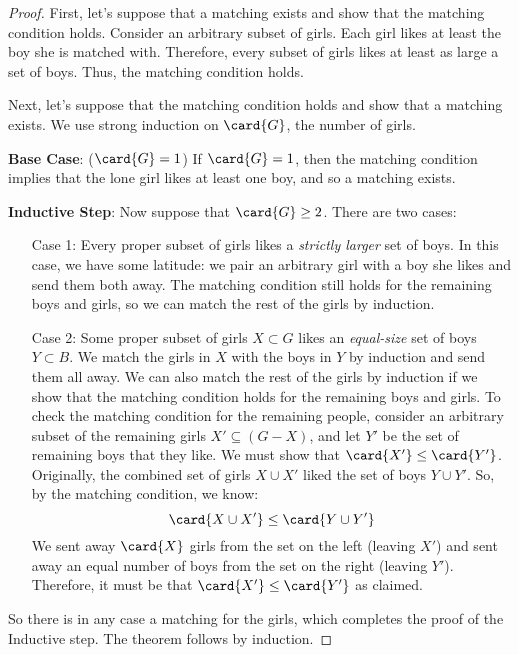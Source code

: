 \begin{proof}
First, let's suppose that a matching exists and show that the matching condition
holds.  Consider an arbitrary subset of girls.  Each girl likes at least the boy she
is matched with.  Therefore, every subset of girls likes at least as large a set of
boys.  Thus, the matching condition holds.

Next, let's suppose that the matching condition holds and show that a matching
exists.  We use strong induction on $\card{G}$, the number of girls.

\textbf{Base Case}: ($\card{G}=1$) If $\card{G} = 1$, then the 
matching condition implies that the lone girl likes at least one boy, and so a
matching exists.

\textbf{Inductive Step}: Now suppose that $\card{G} \geq 2$.  There are two cases:

\begin{itemize}

\item[Case 1:] Every proper subset of girls likes a \emph{strictly larger} set of
  boys.  In this case, we have some latitude: we pair an arbitrary girl with a boy
  she likes and send them both away.  The matching condition still holds for the
  remaining boys and girls, so we can match the rest of the girls by induction.

\item[Case 2:] Some proper subset of girls $X \subset G$ likes an \emph{equal-size}
  set of boys $Y \subset B$.  We match the girls in $X$ with the boys in $Y$ by
  induction and send them all away.  We can also match the rest of the girls by
  induction if we show that the matching condition holds for the remaining boys and
  girls.  To check the matching condition for the remaining people, consider an
  arbitrary subset of the remaining girls $X' \subseteq (G - X)$, and let $Y'$ be the
  set of remaining boys that they like.  We must show that
  $\card{X'} \leq \card{Y'}$.  Originally, the combined set of girls $X \cup X'$
  liked the set of boys $Y \cup Y'$.  So, by the matching condition, we know:
%
\[
\card{X \cup X'}  \leq  \card{Y \cup Y'}
\]
%
We sent away $\card{X}$ girls from the set on the left (leaving $X'$) and sent away
an equal number of boys from the set on the right (leaving $Y'$).  Therefore, it must
be that $\card{X'}
\leq \card{Y'}$ as claimed.
\end{itemize}

So there is in any case a matching for the girls, which completes the proof of the
Inductive step.   The theorem follows by induction.
\end{proof}

